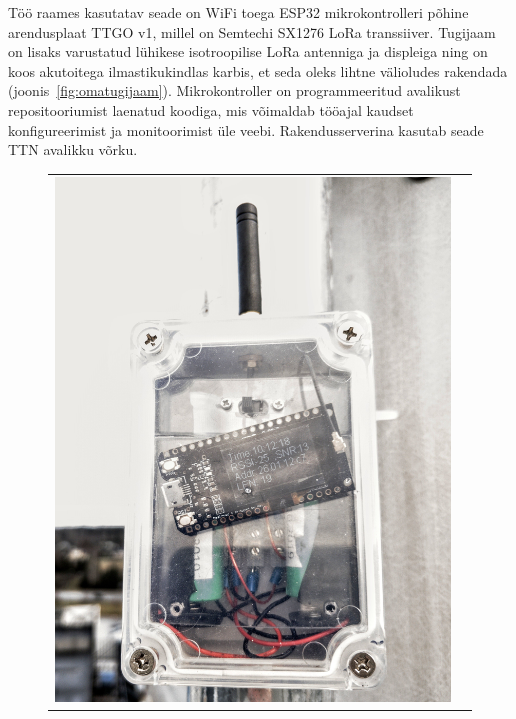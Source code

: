 \documentclass[12pt]{article}
\begin{document}
Töö raames kasutatav seade on WiFi toega ESP32 mikrokontrolleri põhine arendusplaat TTGO v1, millel on Semtechi SX1276 LoRa transsiiver.
Tugijaam on lisaks varustatud lühikese isotroopilise LoRa antenniga ja displeiga ning on koos akutoitega ilmastikukindlas karbis, et seda oleks lihtne välioludes rakendada (joonis~\ref{fig:omatugijaam}).
Mikrokontroller on programmeeritud avalikust repositooriumist laenatud koodiga, mis võimaldab tööajal kaudset konfigureerimist ja monitoorimist üle veebi.
Rakendusserverina kasutab seade TTN avalikku võrku.

\begin{figure} [htbp]
    \begin{tabular}{c c}
        \begin{minipage}{0.42\textwidth}
            \includegraphics[width=\textwidth]{figures/ttn-jaam.jpeg}
        \end{minipage}
        &
        \begin{minipage}{0.53\textwidth}

\end{minipage}
\end{tabular}
\end{figure}
\end{document}
